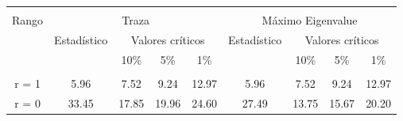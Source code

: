 \documentclass[border=3mm,preview]{standalone}
\numberwithin{equation}{section}
\begin{document}
\centering
\begin{varwidth}{\linewidth}
\begin{table}
\small
\begin{tabular}{ccccc|cccc}
\toprule \\ 
Rango &  \multicolumn{4}{c}{Traza} & \multicolumn{4}{c}{Máximo Eigenvalue} \\ 
 & \multicolumn{1}{c}{Estadístico} & \multicolumn{3}{c}{Valores críticos} & \multicolumn{1}{c}{Estadístico} & \multicolumn{3}{c}{Valores críticos} \\
& & 10\% & 5\% & 1\% & & 10\% & 5\% & 1\% \\ 
\cmidrule(l){1-9} \\
r = 1 & 5.96  & 7.52 & 9.24 & 12.97 & 5.96 & 7.52 & 9.24 & 12.97\\ 
r = 0 & 33.45 & 17.85 & 19.96 & 24.60 & 27.49 & 13.75 & 15.67 & 20.20\\
\bottomrule 
\end{tabular}
\end{table}
\end{varwidth}
\end{document}
